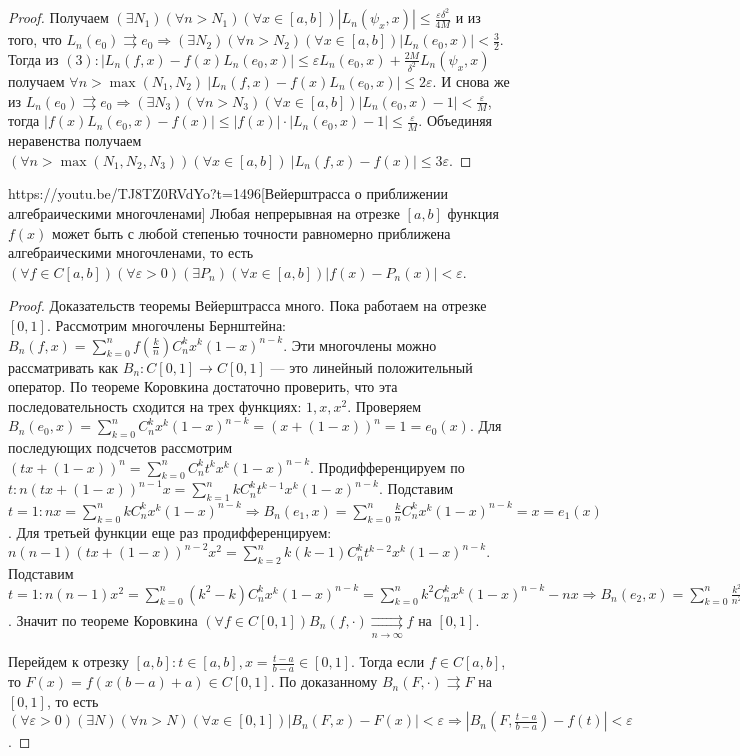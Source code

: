 \begin{proof}
Получаем $(\exists N_1)(\forall n > N_1)(\forall x\in [a,b]) |L_n(\psi_x,x)|\leqslant\frac{\varepsilon\delta^2}{4M}$ и из того, что $L_n(e_0)\rightrightarrows  e_0\Rightarrow (\exists N_2)(\forall n > N_2)(\forall x\in [a,b]) |L_n(e_0,x)|<\frac{3}{2}$. Тогда из $(3): |L_n(f,x)-f(x)L_n(e_0,x)|\leqslant\varepsilon L_n(e_0,x)+\frac{2M}{\delta^2}L_n(\psi_x,x)$ получаем $\forall n > \max(N_1, N_2)\  |L_n(f,x)-f(x)L_n(e_0, x)|\leqslant 2\varepsilon$. И снова же из $L_n(e_0)\rightrightarrows e_0\Rightarrow(\exists N_3)(\forall n>N_3)(\forall x\in [a,b]) |L_n(e_0, x)-1|<\frac{\varepsilon}{M}$, тогда $|f(x)L_n(e_0, x)-f(x)|\leqslant
|f(x)|\cdot|L_n(e_0,x)-1|\leqslant\frac{\varepsilon}{M}$. Объединяя неравенства получаем $(\forall n > \max(N_1, N_2, N_3))(\forall x\in [a,b])\ |L_n(f,x)-f(x)|\leqslant 3\varepsilon$.
\end{proof}

\begin{linkthm}{https://youtu.be/TJ8TZ0RVdYo?t=1496}[Вейерштрасса о приближении алгебраическими многочленами]
Любая\label{11.4.2} непрерывная на отрезке $[a,b]$ функция $f(x)$ может быть с любой степенью точности равномерно приближена алгебраическими многочленами, то есть $(\forall f\in C[a,b])(\forall\varepsilon>0)(\exists P_n)(\forall x\in[a,b])|f(x)-P_n(x)|<\varepsilon$.
\end{linkthm}
\begin{proof}
Доказательств теоремы Вейерштрасса много. Пока работаем на отрезке $[0,1]$. Рассмотрим многочлены Бернштейна: $B_n(f,x)=\sum\limits_{k=0}^n f\left(\frac{k}{n}\right)C_n^k x^k (1-x)^{n-k}$. Эти многочлены можно рассматривать как $B_n:C[0,1]\to C[0,1]$ --- это линейный положительный оператор. По теореме Коровкина достаточно проверить, что эта последовательность сходится на трех функциях: $1, x, x^2$. Проверяем $B_n(e_0,x)=\sum\limits_{k=0}^n C_n^k x^k (1-x)^{n-k}=(x+(1-x))^n=1=e_0(x)$. Для последующих подсчетов рассмотрим $(tx+(1-x))^n=\sum\limits_{k=0}^n C_n^k t^k x^k (1-x)^{n-k}$. Продифференцируем по $t: n(tx+(1-x))^{n-1}x=\sum\limits_{k=1}^n k C_n^k t^{k-1}x^k(1-x)^{n-k}$. Подставим $t=1:nx=\sum\limits_{k=0}^n kC_n^k x^k (1-x)^{n-k}\Rightarrow B_n(e_1,x)=\sum\limits_{k=0}^n \frac{k}{n}C_n^kx^k(1-x)^{n-k}=x=e_1(x)$. Для третьей функции еще раз продифференцируем: $n(n-1)(tx+(1-x))^{n-2}x^2=\sum\limits_{k=2}^n k(k-1)C_n^kt^{k-2}x^k(1-x)^{n-k}$. Подставим $t=1:n(n-1)x^2=\sum\limits_{k=0}^n(k^2-k)C_n^kx^k(1-x)^{n-k}=\sum\limits_{k=0}^nk^2C_n^kx^k(1-x)^{n-k}-nx\Rightarrow B_n(e_2,x)=\sum\limits_{k=0}^n\frac{k^2}{n^2}C_n^kx^k(1-x)^{n-k}=\frac{n-1}{n}x^2+\frac{x}{n}\underset{n\to\infty}{\rightrightarrows}x^2=e_2(x)$. Значит по теореме Коровкина $(\forall f\in C[0,1]) B_n(f,\cdot)\underset{n\to\infty}{\rightrightarrows}f$ на $[0,1]$.

Перейдем к отрезку $[a,b]: t\in[a,b], x=\frac{t-a}{b-a}\in[0,1]$. Тогда если $f\in C[a,b]$, то $F(x)=f(x(b-a)+a)\in C[0,1]$. По доказанному $B_n(F,\cdot)\rightrightarrows F$ на $[0,1]$, то есть $(\forall\varepsilon >0)(\exists N)(\forall n>N)(\forall x\in[0,1])\left|B_n(F,x)-F(x)\right|<\varepsilon\Rightarrow \left|B_n(F,\frac{t-a}{b-a})-f(t)\right|<\varepsilon$.
\end{proof}

